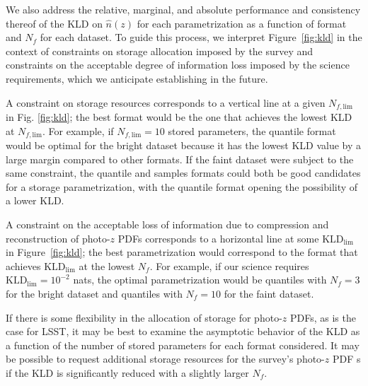 \documentclass[\docopts]{\docclass}
\newcommand{\pz}{photo-$z$ PDF}
\newcommand{\mgdata}{bright\xspace}
\newcommand{\ssdata}{faint\xspace}
\begin{document}
We also address the relative, marginal, and absolute performance and 
consistency thereof of the KLD on $\hat{n}(z)$ for each parametrization as a 
function of format and $N_{f}$ for each dataset.
To guide this process, we interpret Figure~\ref{fig:kld} in the context of 
constraints on storage allocation imposed by the survey and constraints on the 
acceptable degree of information loss imposed by the science requirements, 
which we anticipate establishing in the future.

A constraint on storage resources corresponds to a vertical line at a given 
$N_{f, \mathrm{lim}}$ in Fig. \ref{fig:kld}; the best format would be the one 
that achieves the lowest KLD at $N_{f, \mathrm{lim}}$.
For example, if $N_{f, \mathrm{lim}}=10$ stored parameters, the quantile format 
would be optimal for the \mgdata dataset because it has the lowest KLD value by 
a large margin compared to other formats.
If the \ssdata dataset were subject to the same constraint, the quantile and 
samples formats could both be good candidates for a storage parametrization, 
with the quantile format opening the possibility of a lower KLD.

A constraint on the acceptable loss of information due to compression and 
reconstruction of \pz s corresponds to a horizontal line at some 
$\mathrm{KLD}_{\mathrm{lim}}$ in Figure~\ref{fig:kld}; the best parametrization 
would correspond to the format that achieves $\mathrm{KLD}_{\mathrm{lim}}$ at 
the lowest $N_{f}$.
For example, if our science requires $\mathrm{KLD}_{\mathrm{lim}}=10^{-2}$ 
nats, the optimal parametrization would be quantiles with $N_{f}=3$ for the 
\mgdata dataset and quantiles with $N_{f}=10$ for the \ssdata dataset.

If there is some flexibility in the allocation of storage for \pz s, as is the 
case for LSST, it may be best to examine the asymptotic behavior of the KLD as 
a function of the number of stored parameters for each format considered.
It may be possible to request additional storage resources for the survey's \pz 
s if the KLD is significantly reduced with a slightly larger $N_{f}$.
\end{document}
